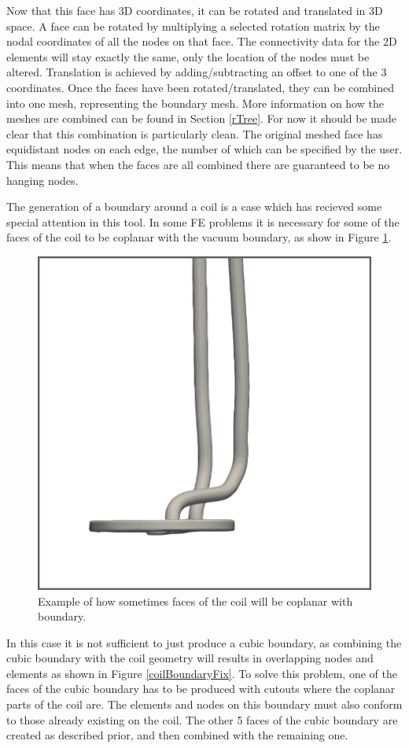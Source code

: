 \documentclass[12pt, letterpaper]{article}
\begin{document}
Now that this face has 3D coordinates, it can be rotated and translated in 3D space. A face can be rotated by multiplying a selected rotation matrix by the nodal coordinates of all the nodes on that face. The connectivity data for the 2D elements will stay exactly the same, only the location of the nodes must be altered. Translation is achieved by adding/subtracting an offset to one of the 3 coordinates. Once the faces have been rotated/translated, they can be combined into one mesh, representing the boundary mesh. More information on how the meshes are combined can be found in Section \ref{rTree}. For now it should be made clear that this combination is particularly clean. The original meshed face has equidistant nodes on each edge, the number of which can be specified by the user. This means that when the faces are all combined there are guaranteed to be no hanging nodes.

The generation of a boundary around a coil is a case which has recieved some special attention in this tool. In some FE problems it is necessary for some of the faces of the coil to be coplanar with the vacuum boundary, as show in Figure \ref{coplanarCoilFig}. 

\begin{figure}
\begin{center}
\includegraphics[width=0.5\linewidth]{coplanarCoil.png}
\end{center}
\caption{Example of how sometimes faces of the coil will be coplanar with boundary.}
\label{coplanarCoilFig}
\end{figure}

In this case it is not sufficient to just produce a cubic boundary, as combining the cubic boundary with the coil geometry will results in overlapping nodes and elements as shown in Figure \ref{coilBoundaryFix}. To solve this problem, one of the faces of the cubic boundary has to be produced with cutouts where the coplanar parts of the coil are. The elements and nodes on this boundary must also conform to those already existing on the coil. The other 5 faces of the cubic boundary are created as described prior, and then combined with the remaining one.
\end{document}
